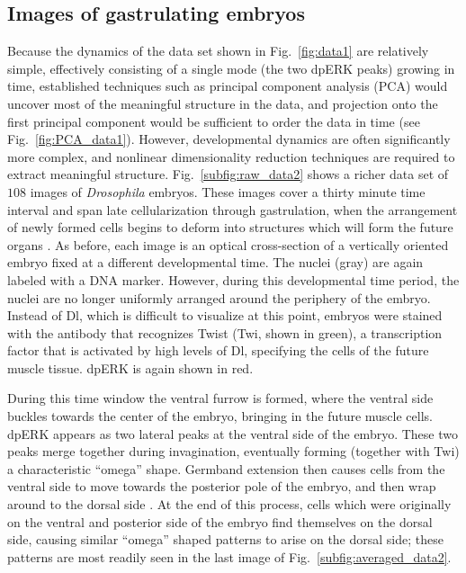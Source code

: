 \documentclass{pnastwo}
\newcommand{\fig}[0]{Fig.}
\begin{document}
\begin{article}
%

\subsection{Images of gastrulating embryos}

%
Because the dynamics of the data set shown in \fig~\ref{fig:data1} are relatively simple, effectively consisting of a single mode (the two dpERK peaks) growing in time, established techniques such as principal component analysis (PCA) \cite{shlens2005tutorial} would uncover most of the meaningful structure in the data, and projection onto the first principal component would be sufficient to order the data in time (see \fig~\ref{fig:PCA_data1}).
%
However, developmental dynamics are often significantly more complex, and nonlinear dimensionality reduction techniques are required to extract meaningful structure.
%
\fig~\ref{subfig:raw_data2} shows a richer data set of $108$ images of {\it Drosophila} embryos.
%
These images cover a thirty minute time interval and span late cellularization through gastrulation, when the arrangement of newly formed cells begins to deform into structures which will form the future organs \cite{leptin2005gastrulation}.
%
As before, each image is an optical cross-section of a vertically oriented embryo fixed at a different developmental time.
%
The nuclei (gray) are again labeled with a DNA marker.
%
However, during this developmental time period, the nuclei are no longer uniformly arranged around the periphery of the embryo.
%
Instead of Dl, which is difficult to visualize at this point, embryos were stained with the antibody that recognizes Twist (Twi, shown in green), a transcription factor that is activated by high levels of Dl, specifying the cells of the future muscle tissue.
%
dpERK is again shown in red.

%
During this time window the ventral furrow is formed, where the ventral side buckles towards the center of the embryo, bringing in the future muscle cells.
%
dpERK appears as two lateral peaks at the ventral side of the embryo.
%
These two peaks merge together during invagination, eventually forming (together with Twi) a characteristic ``omega'' shape.
%
Germband extension then causes cells from the ventral side to move towards the posterior pole of the embryo, and then wrap around to the dorsal side \cite{leptin2005gastrulation}.
%
At the end of this process, cells which were originally on the ventral and posterior side of the embryo find themselves on the dorsal side, causing similar ``omega'' shaped patterns to arise on the dorsal side; these patterns are most readily seen in the last image of \fig~\ref{subfig:averaged_data2}.


\end{article}
\end{document}
